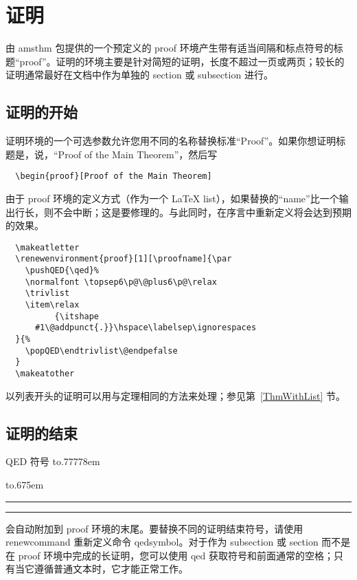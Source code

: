 \documentclass[11pt,twoside]{article}
\providecommand{\qq}[1]{“#1”}
\newcommand{\ntt}{%
  \fontfamily\ttdefault \fontseries\mddefault \fontshape\updefault
  \selectfont
}
\DeclareRobustCommand{\cn}[1]{{\ntt\bslchar#1}}
\DeclareRobustCommand{\pkg}[1]{{\ntt#1}}
\DeclareRobustCommand{\env}[1]{{\ntt#1}}
\providecommand{\qedsymbol}{\leavevmode
  \hbox to.77778em{%
  \hfil\vrule
  \vbox to.675em{\hrule width.6em\vfil\hrule}%
  \vrule\hfil}}
\def\latex/{{\protect\LaTeX}}
\begin{document}


\section{证明}

由 \pkg{amsthm} 包提供的一个预定义的 \env{proof} 环境产生带有适当间隔和标点符号的标题\qq{proof}。证明的环境主要是针对简短的证明，长度不超过一页或两页；较长的证明通常最好在文档中作为单独的 \cn{section} 或 \cn{subsection} 进行。

\subsection{证明的开始}

证明环境的一个可选参数允许您用不同的名称替换标准\qq{Proof}。如果你想证明标题是，说，\qq{Proof of the Main Theorem}，然后写
\begin{verbatim}
  \begin{proof}[Proof of the Main Theorem]
\end{verbatim}

由于 \env{proof} 环境的定义方式（作为一个 \latex/ list），如果替换的“name”比一个输出行长，则不会中断；这是要修理的。与此同时，在序言中重新定义将会达到预期的效果。
\begin{verbatim}
  \makeatletter
  \renewenvironment{proof}[1][\proofname]{\par
    \pushQED{\qed}%
    \normalfont \topsep6\p@\@plus6\p@\relax
    \trivlist
    \item\relax
          {\itshape
      #1\@addpunct{.}}\hspace\labelsep\ignorespaces
  }{%
    \popQED\endtrivlist\@endpefalse
  }
  \makeatother
\end{verbatim}

以列表开头的证明可以用与定理相同的方法来处理；参见第~\ref{ThmWithList} 节。

\subsection{证明的结束}

QED 符号 \qedsymbol{} 会自动附加到 \env{proof} 环境的末尾。要替换不同的证明结束符号，请使用 \cn{renewcommand} 重新定义命令 \cn{qedsymbol}。对于作为 subsection 或 section 而不是在 \env{proof} 环境中完成的长证明，您可以使用 \cn{qed} 获取符号和前面通常的空格；只有当它遵循普通文本时，它才能正常工作。
\end{document}
